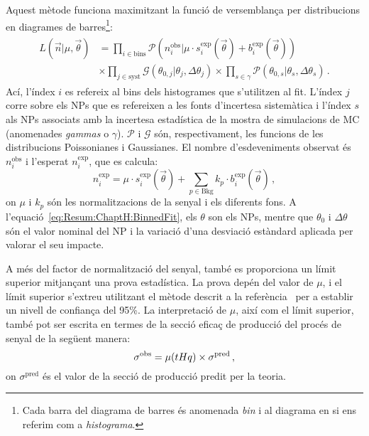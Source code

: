 Aquest mètode funciona maximitzant la funció de versemblança per distribucions en diagrames de 
barres\footnote{Cada barra del diagrama de barres és anomenada \textit{bin} i al diagrama en si ens referim com a \textit{histograma}.}:
\begin{align}\label{eq:Resum:ChaptH:BinnedFit}
\begin{split}
	L(\overrightarrow{n}|\mu, \overrightarrow{\theta}) 
	& = \prod_{i \in \text{bins}} \mathcal{P}\left(n_{i}^{\text{obs}} | \mu \cdot s_{i}^{\text{exp}}(\overrightarrow{\theta}) + b_{i}^{\text{exp}}(\overrightarrow{\theta})\right) \\
	& \times \prod_{j \in \text{syst}} \mathcal{G}(\theta_{0, j}|\theta_{j}, \Delta \theta_{j}) 
	\times \prod_{s \in \gamma} \mathcal{P}(\theta_{0, s}|\theta_{s}, \Delta \theta_{s}) \, .
\end{split}
\end{align}
Ací, l'índex $i$ es refereix al bins dels histogrames que s'utilitzen al fit. L'índex $j$ 
corre sobre els NPs que es refereixen a les fonts d'incertesa sistemàtica i l'índex 
$s$ als NPs associats amb la incertesa estadística de la mostra de simulacions 
de MC (anomenades \textit{gammas} o $\gamma$). 
$\mathcal{P}$ i $\mathcal{G}$ són, respectivament, les funcions de les distribucions
Poissonianes i Gaussianes.  El nombre d'esdeveniments observat és $n_{i}^{\text{obs}}$
i l'esperat $n_{i}^{\text{exp}}$, que es calcula:
\begin{equation*}
	n_{i}^{\text{exp}} = \mu \cdot s_{i}^{\text{exp}}(\overrightarrow{\theta}) + \sum_{p \in \text{Bkg}} k_{p} \cdot b_{i}^{\text{exp}}(\overrightarrow{\theta}) \, ,
\end{equation*}
on $\mu$ i $k_p$ són les normalitzacions de la senyal i els diferents fons. 
A l'equació~\ref{eq:Resum:ChaptH:BinnedFit}, els $\theta$ son els NPs, mentre
que $\theta_{0}$ i $\Delta \theta$ són el valor nominal del NP i la variació d'una desviació 
estàndard aplicada per valorar el seu impacte.



A més del factor de normalització del senyal, també es proporciona un límit superior mitjançant una prova estadística. 
La prova depén del valor de $\mu$, i el límit superior s'extreu utilitzant el mètode descrit a la 
referència~\cite{Read:2002hq} per a establir un nivell de confiança del 95\%. 
La interpretació de $\mu$, així com el límit superior, també pot ser escrita en termes de la secció eficaç 
de producció del procés de senyal de la següent manera:
\begin{equation}
	\sigma^{\text{obs}} = \mu(tHq) \times \sigma^{\text{pred}} \, ,
\end{equation}
on $\sigma^{\text{pred}}$ és el valor de la secció de producció predit per la teoria.


